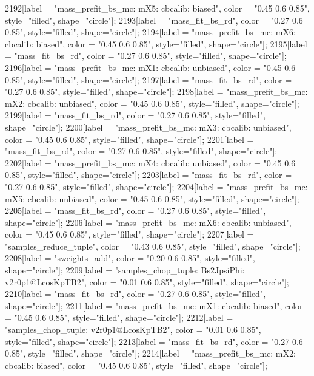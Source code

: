 {	2192[label = "mass_prefit_bs_mc\nmassbin: mX5\nmassmodel: cbcalib\ntrigger: biased", color = "0.45 0.6 0.85", style="filled", shape="circle"];
	2193[label = "mass_fit_bs_rd", color = "0.27 0.6 0.85", style="filled", shape="circle"];
	2194[label = "mass_prefit_bs_mc\nmassbin: mX6\nmassmodel: cbcalib\ntrigger: biased", color = "0.45 0.6 0.85", style="filled", shape="circle"];
	2195[label = "mass_fit_bs_rd", color = "0.27 0.6 0.85", style="filled", shape="circle"];
	2196[label = "mass_prefit_bs_mc\nmassbin: mX1\nmassmodel: cbcalib\ntrigger: unbiased", color = "0.45 0.6 0.85", style="filled", shape="circle"];
	2197[label = "mass_fit_bs_rd", color = "0.27 0.6 0.85", style="filled", shape="circle"];
	2198[label = "mass_prefit_bs_mc\nmassbin: mX2\nmassmodel: cbcalib\ntrigger: unbiased", color = "0.45 0.6 0.85", style="filled", shape="circle"];
	2199[label = "mass_fit_bs_rd", color = "0.27 0.6 0.85", style="filled", shape="circle"];
	2200[label = "mass_prefit_bs_mc\nmassbin: mX3\nmassmodel: cbcalib\ntrigger: unbiased", color = "0.45 0.6 0.85", style="filled", shape="circle"];
	2201[label = "mass_fit_bs_rd", color = "0.27 0.6 0.85", style="filled", shape="circle"];
	2202[label = "mass_prefit_bs_mc\nmassbin: mX4\nmassmodel: cbcalib\ntrigger: unbiased", color = "0.45 0.6 0.85", style="filled", shape="circle"];
	2203[label = "mass_fit_bs_rd", color = "0.27 0.6 0.85", style="filled", shape="circle"];
	2204[label = "mass_prefit_bs_mc\nmassbin: mX5\nmassmodel: cbcalib\ntrigger: unbiased", color = "0.45 0.6 0.85", style="filled", shape="circle"];
	2205[label = "mass_fit_bs_rd", color = "0.27 0.6 0.85", style="filled", shape="circle"];
	2206[label = "mass_prefit_bs_mc\nmassbin: mX6\nmassmodel: cbcalib\ntrigger: unbiased", color = "0.45 0.6 0.85", style="filled", shape="circle"];
	2207[label = "samples_reduce_tuple", color = "0.43 0.6 0.85", style="filled", shape="circle"];
	2208[label = "sweights_add", color = "0.20 0.6 0.85", style="filled", shape="circle"];
	2209[label = "samples_chop_tuple\nmode: Bs2JpsiPhi\nversion: v2r0p1@LcosKpTB2", color = "0.01 0.6 0.85", style="filled", shape="circle"];
	2210[label = "mass_fit_bs_rd", color = "0.27 0.6 0.85", style="filled", shape="circle"];
	2211[label = "mass_prefit_bs_mc\nmassbin: mX1\nmassmodel: cbcalib\ntrigger: biased", color = "0.45 0.6 0.85", style="filled", shape="circle"];
	2212[label = "samples_chop_tuple\nversion: v2r0p1@LcosKpTB2", color = "0.01 0.6 0.85", style="filled", shape="circle"];
	2213[label = "mass_fit_bs_rd", color = "0.27 0.6 0.85", style="filled", shape="circle"];
	2214[label = "mass_prefit_bs_mc\nmassbin: mX2\nmassmodel: cbcalib\ntrigger: biased", color = "0.45 0.6 0.85", style="filled", shape="circle"];
}

